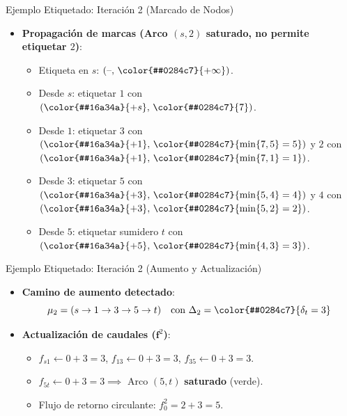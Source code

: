 \documentclass[
  ignorenonframetext,
]{beamer}
\providecommand{\tightlist}{%
  \setlength{\itemsep}{0pt}\setlength{\parskip}{0pt}}
\begin{document}
\begin{frame}{Ejemplo Etiquetado: Iteración 2 (Marcado de Nodos)}
\label{ejemplo-etiquetado-iteraciuxf3n-2-marcado-de-nodos}
\begin{itemize}
\tightlist
\item
  \textbf{Propagación de marcas (Arco \((s,2)\) saturado, no permite
  etiquetar \(2\))}:

  \begin{itemize}
  \tightlist
  \item
    Etiqueta en \(s\): \((\text{–}, \, \color{#0284c7}{+\infty})\).
  \item
    Desde \(s\): etiquetar \(1\) con
    \((\color{#16a34a}{+s}, \, \color{#0284c7}{7})\).
  \item
    Desde \(1\): etiquetar \(3\) con
    \((\color{#16a34a}{+1}, \, \color{#0284c7}{\min\{7, 5\} = 5})\) y
    \(2\) con
    \((\color{#16a34a}{+1}, \, \color{#0284c7}{\min\{7, 1\} = 1})\).
  \item
    Desde \(3\): etiquetar \(5\) con
    \((\color{#16a34a}{+3}, \, \color{#0284c7}{\min\{5, 4\} = 4})\) y
    \(4\) con
    \((\color{#16a34a}{+3}, \, \color{#0284c7}{\min\{5, 2\} = 2})\).
  \item
    Desde \(5\): etiquetar sumidero \(t\) con
    \((\color{#16a34a}{+5}, \, \color{#0284c7}{\min\{4, 3\} = 3})\).
  \end{itemize}
\end{itemize}
\end{frame}

\begin{frame}{Ejemplo Etiquetado: Iteración 2 (Aumento y Actualización)}
\label{ejemplo-etiquetado-iteraciuxf3n-2-aumento-y-actualizaciuxf3n}
\begin{itemize}
\item
  \textbf{Camino de aumento detectado}:
  \[\mu_2 = (s \to 1 \to 3 \to 5 \to t) \quad \text{con } \Delta_2 = \color{#0284c7}{\delta_t = 3}\]
\item
  \textbf{Actualización de caudales (\(\mathbf{f}^2\))}:

  \begin{itemize}
  \tightlist
  \item
    \(f_{s1} \leftarrow 0 + 3 = 3\), \(f_{13} \leftarrow 0 + 3 = 3\),
    \(f_{35} \leftarrow 0 + 3 = 3\).
  \item
    \(f_{5t} \leftarrow 0 + 3 = 3 \implies\) Arco \((5,t)\)
    \textbf{saturado} (verde).
  \item
    Flujo de retorno circulante: \(f_0^2 = 2 + 3 = 5\).
  \end{itemize}
\end{itemize}
\end{frame}
\end{document}
